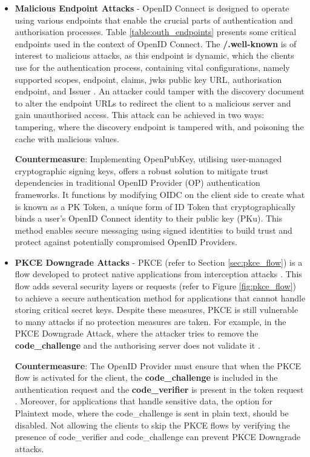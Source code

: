 \begin{itemize}
    \item \textbf{Malicious Endpoint Attacks} - OpenID Connect is designed to operate using various endpoints that enable the crucial parts of authentication and authorisation processes. Table \ref{table:outh_endpoints} presents some critical endpoints used in the context of OpenID Connect. The \textbf{/.well-known} is of interest to malicious attacks, as this endpoint is dynamic, which the clients use for the authentication process, containing vital configurations, namely supported scopes, endpoint, claims, jwks public key URL, authorisation endpoint, and Issuer \citep{oidc_attacks}. An attacker could tamper with the discovery document to alter the endpoint URLs to redirect the client to a malicious server and gain unauthorised access. This attack can be achieved in two ways: tampering, where the discovery endpoint is tampered with, and poisoning the cache with malicious values.\newline

    \textbf{Countermeasure}: Implementing OpenPubKey, utilising user-managed cryptographic signing keys, offers a robust solution to mitigate trust dependencies in traditional OpenID Provider (OP) authentication frameworks.  It functions by modifying OIDC on the client side to create what is known as a PK Token, a unique form of ID Token that cryptographically binds a user's OpenID Connect identity to their public key (PKu)\citep{openpub_key}. This method enables secure messaging using signed identities to build trust and protect against potentially compromised OpenID Providers.


    \item \textbf{PKCE Downgrade Attacks} - PKCE (refer to Section \ref{sec:pkce_flow}) is a flow developed to protect native applications from interception attacks \citep{pkce}. This flow adds several security layers or requests (refer to Figure \ref{fig:pkce_flow}) to achieve a secure authentication method for applications that cannot handle storing critical secret keys. Despite these measures, PKCE is still vulnerable to many attacks if no protection measures are taken. For example, in the PKCE Downgrade Attack, where the attacker tries to remove the \textbf{code\_challenge} and the authorising server does not validate it \citep{oidc_attacks}.\newline

    \textbf{Countermeasure}: The OpenID Provider must ensure that when the PKCE flow is activated for the client, the \textbf{code\_challenge} is included in the authentication request and the \textbf{code\_verifier} is present in the token request \citep{oidc_attacks}. Moreover, for applications that handle sensitive data, the option for Plaintext mode, where the code\_challenge is sent in plain text, should be disabled. Not allowing the clients to skip the PKCE flows by verifying the presence of code\_verifier and code\_challenge can prevent PKCE Downgrade attacks. \newline
\end{itemize}

